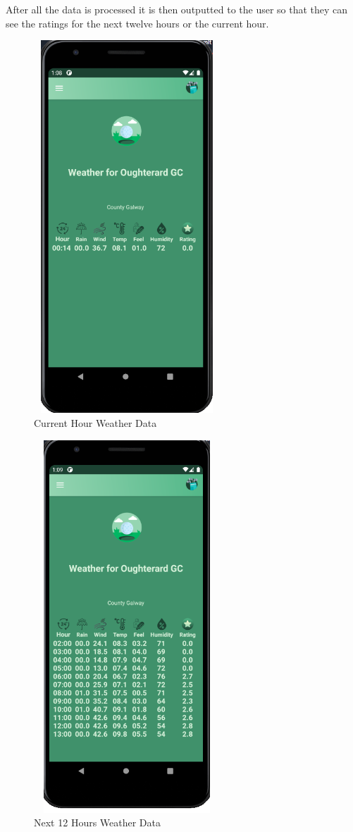After all the data is processed it is then outputted to the user so that they can see the ratings for the next twelve hours or the current hour.

\begin{figure}[H]
    \centering
    \includegraphics[width=7cm,height = 14cm]{img/CurrentDataOutput.PNG}
    \caption{Current Hour Weather Data}
    \label{fig:altas config}
\end{figure}

\begin{figure}[H]
    \centering
    \includegraphics[width=7cm,height = 14cm]{img/HourlyDataOutput.PNG}
    \caption{ Next 12 Hours Weather Data}
    \label{fig:altas config}
\end{figure}


